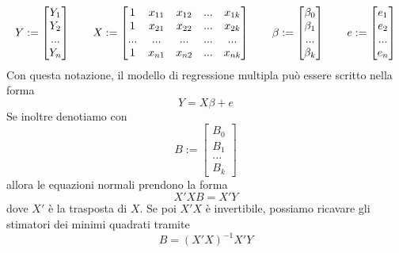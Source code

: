 \documentclass[11pt]{article}
\begin{document}
\begin{displaymath}
    Y:=\left[\begin{matrix}
        Y_1\\
        Y_2\\ 
        ...\\
        Y_n
    \end{matrix}\right]
    \hspace{20px}
    X:=
    \left[
        \begin{matrix}
            1&x_{11}&x_{12}&...&x_{1k}\\ 
            1&x_{21}&x_{22}&...&x_{2k}\\
            ...&...&...&...&...\\ 
            1&x_{n1}&x_{n2}&...&x_{nk}
        \end{matrix}
    \right]
    \hspace{20px}
    \beta:=
    \left[
        \begin{matrix}
            \beta_0\\ 
            \beta_1\\ 
            ...\\ 
            \beta_k
        \end{matrix}
    \right]
    \hspace{20px}
    e:=
    \left[
        \begin{matrix}
            e_1\\ 
            e_2\\ 
            ...\\ 
            e_n
        \end{matrix}
    \right]
\end{displaymath}
Con questa notazione, il modello di regressione multipla può essere scritto nella forma 
\begin{displaymath}
    Y=X\beta + e
\end{displaymath}
Se inoltre denotiamo con 
\begin{displaymath}
    B:=
    \left[
        \begin{matrix}
            B_0\\ 
            B_1\\ 
            ...\\ 
            B_k            
        \end{matrix}
    \right]
\end{displaymath}
allora le equazioni normali prendono la forma 
\begin{displaymath}
    X'XB=X'Y
\end{displaymath}
dove $X'$ è la trasposta di $X$. Se poi $X'X$ è invertibile, possiamo ricavare gli stimatori dei minimi quadrati tramite
\begin{displaymath}
    B=(X'X)^{-1}X'Y
\end{displaymath}
\end{document}
